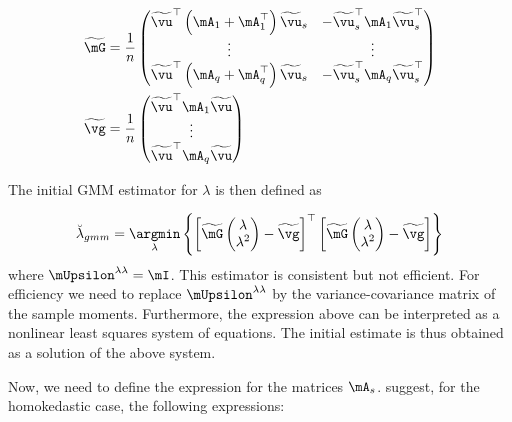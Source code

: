 \documentclass[english,12pt]{book}\usepackage[]{graphicx}\usepackage[]{xcolor}
\begin{document}
\begin{equation*}
\begin{aligned}
\widetilde{\mG} & = \frac{1}{n}
                    \begin{pmatrix}
                      \widetilde{\vu}^\top\left(\mA_1 + \mA^\top_1\right)\widetilde{\vu}_s & - \widetilde{\vu}^\top_s\mA_1\widetilde{\vu}^\top_s \\
                      \vdots & \vdots \\
                      \widetilde{\vu}^\top\left(\mA_q + \mA^\top_q\right)\widetilde{\vu}_s & - \widetilde{\vu}^\top_s\mA_q\widetilde{\vu}^\top_s
                    \end{pmatrix} \\
\widetilde{\vg} & = \frac{1}{n}\begin{pmatrix}
                                \widetilde{\vu}^\top\mA_1\widetilde{\vu} \\
                                \vdots \\
                                \widetilde{\vu}^\top\mA_q\widetilde{\vu}
                                \end{pmatrix}
\end{aligned}
\end{equation*}


The initial GMM estimator for $\lambda$ is then defined as

\begin{equation}
\breve{\lambda}_{gmm} = \underset{\lambda}{\argmin}\left\lbrace \left[\widetilde{\mG}\begin{pmatrix} \lambda \\
                \lambda^2
\end{pmatrix} - \widetilde{\vg} \right]^\top \left[\widetilde{\mG}\begin{pmatrix} \lambda \\
                \lambda^2
\end{pmatrix} - \widetilde{\vg} \right]\right\rbrace
\end{equation}
%
where $\mUpsilon^{\lambda\lambda} = \mI$. This estimator is consistent but not efficient. For efficiency we need to replace $\mUpsilon^{\lambda\lambda}$ by the variance-covariance matrix of the sample moments. Furthermore, the expression above can be interpreted as a nonlinear least squares system of equations. The initial estimate is thus obtained as a solution of the above system. 

Now, we need to define the expression for the matrices $\mA_s$. \cite{drukker2013two} suggest, for the homokedastic case, the following expressions:
\end{document}
